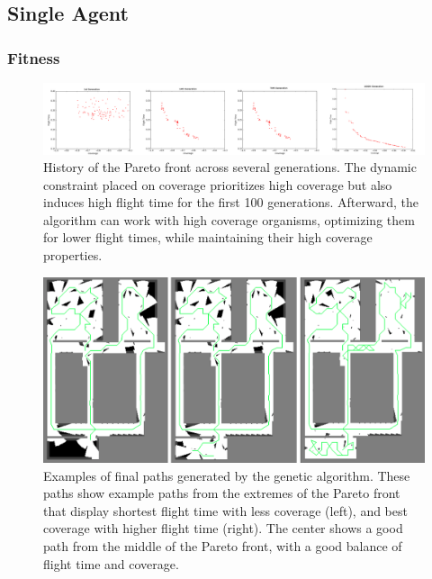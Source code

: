 \documentclass[letterpaper, 10 pt, conference]{ieeeconf}  %
\begin{document}
\subsection{Single Agent}
\subsubsection{Fitness}

\begin{figure}
\centering
\includegraphics[width=1.0\linewidth]{figures/pareto_history2.png}
\caption{History of the Pareto front across several generations. The dynamic constraint placed on coverage prioritizes high coverage but also induces high flight time for the first 100 generations. Afterward, the algorithm can work with high coverage organisms, optimizing them for lower flight times, while maintaining their high coverage properties.}
\label{fig:pareto_cheetos}
\end{figure}

\begin{figure}
\centering
\includegraphics[width=1.0\linewidth]{figures/final_paths.png}
\caption{Examples of final paths generated by the genetic algorithm. These paths show example paths from the extremes of the Pareto front that display shortest flight time with less coverage (left), and best coverage with higher flight time (right). The center shows a good path from the middle of the Pareto front, with a good balance of flight time and coverage.}
\label{fig:final_paths}

\end{figure}
\end{document}
